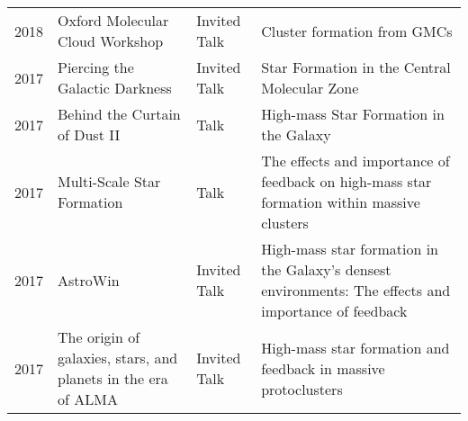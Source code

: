 \begin{tabular}{cp{1.8in}p{1.5cm}p{3.0in}}
    2018 &      Oxford Molecular Cloud Workshop & Invited Talk & Cluster formation from GMCs \\
    2017 &      Piercing the Galactic Darkness & Invited Talk & Star Formation in the Central Molecular Zone \\
    2017 &      Behind the Curtain of Dust II & Talk & High-mass Star Formation in the Galaxy \\
    2017 &      Multi-Scale Star Formation & Talk & The effects and importance of feedback on high-mass star formation within massive clusters \\
    2017 &      AstroWin & Invited Talk & High-mass star formation in the Galaxy's densest environments: The effects and importance of feedback\\
    2017 &      The origin of galaxies, stars, and planets in the era of ALMA & Invited Talk & High-mass star formation and feedback in massive protoclusters \\

\end{tabular}
